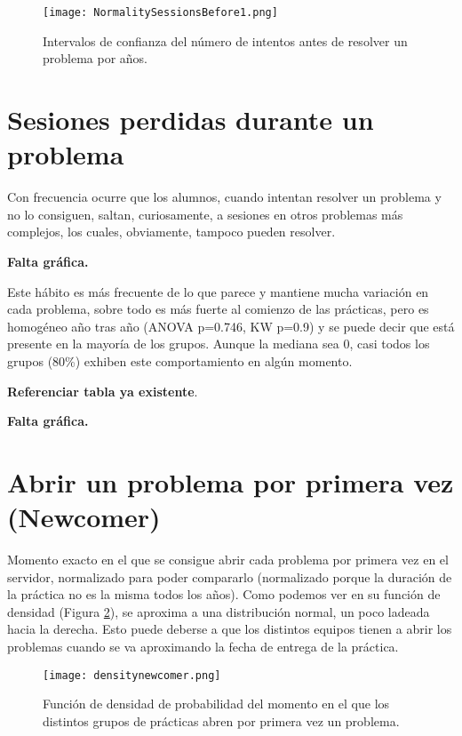 \begin{figure}[H]
    \centering
    \texttt{[image: NormalitySessionsBefore1.png]}
    \caption{Intervalos de confianza del número de intentos antes de resolver un problema por años.}
    \label{fig:confidencesessionsbefore}
\end{figure}

\section{Sesiones perdidas durante un problema}

Con frecuencia ocurre que los alumnos, cuando intentan resolver un problema y no lo consiguen, saltan, curiosamente, a sesiones en otros problemas más complejos, los cuales, obviamente, tampoco pueden resolver.

\textbf{Falta gráfica.}

Este hábito es más frecuente de lo que parece y mantiene mucha variación en cada problema, sobre todo es más fuerte al comienzo de las prácticas, pero es homogéneo año tras año (ANOVA p=0.746, KW p=0.9) y se puede decir que está presente en la mayoría de los grupos. Aunque la mediana sea 0, casi todos los grupos (80\%) exhiben este comportamiento en algún momento.

\textbf{Referenciar tabla ya existente}.

\textbf{Falta gráfica.}

\section{Abrir un problema por primera vez (Newcomer)}

Momento exacto en el que se consigue abrir cada problema por primera vez en el servidor, normalizado para poder compararlo (normalizado porque la duración de la práctica no es la misma todos los años). Como podemos ver en su función de densidad (Figura \ref{fig:densityplotnewcomer}), se aproxima a una distribución normal, un poco ladeada hacia la derecha. Esto puede deberse a que los distintos equipos tienen a abrir los problemas cuando se va aproximando la fecha de entrega de la práctica.

\begin{figure}[H]
    \centering
    \texttt{[image: densitynewcomer.png]}
    \caption{Función de densidad de probabilidad del momento en el que los distintos grupos de prácticas abren por primera vez un problema.}
    \label{fig:densityplotnewcomer}
\end{figure}

